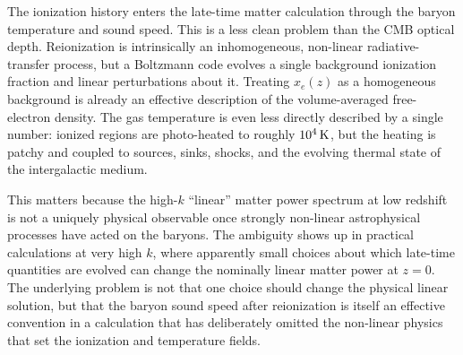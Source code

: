 \documentclass[prd, twocolumn, superscriptaddress, tightenlines, longbibliography, nofootinbib, eqsecnum, amsfonts, amsmath, floatfix, notitlepage]{revtex4-2}
\begin{document}
The ionization history enters the late-time matter calculation through the
baryon temperature and sound speed. This is a less clean problem than the CMB
optical depth. Reionization is intrinsically an inhomogeneous, non-linear
radiative-transfer process, but a Boltzmann code evolves a single background
ionization fraction and linear perturbations about it. Treating $x_e(z)$ as a
homogeneous background is already an effective description of the volume-averaged
free-electron density. The gas temperature is even less directly described by a
single number: ionized regions are photo-heated to roughly $10^4\,{\rm K}$, but
the heating is patchy and coupled to sources, sinks, shocks, and the evolving
thermal state of the intergalactic medium.

This matters because the high-$k$ ``linear'' matter power spectrum at low
redshift is not a uniquely physical observable once strongly non-linear
astrophysical processes have acted on the baryons. The ambiguity shows up in
practical calculations at very high $k$, where apparently small choices about
which late-time quantities are evolved can change the nominally linear matter
power at $z=0$. The underlying problem is not that one choice should change the
physical linear solution, but that the baryon sound speed after reionization is
itself an effective convention in a calculation that has deliberately omitted the
non-linear physics that set the ionization and temperature fields.
\end{document}
